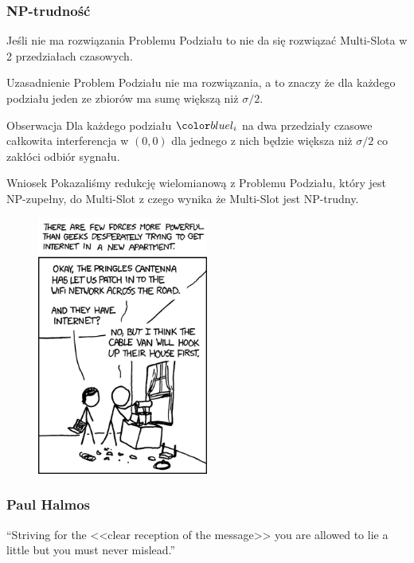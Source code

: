 \documentclass[polish, t,10pt]{beamer}
\begin{document}
\begin{frame}
    \frametitle{NP-trudność}
    Jeśli nie ma rozwiązania Problemu Podziału to nie da się rozwiązać Multi-Slota w 2 przedziałach czasowych.
    \begin{block}{Uzasadnienie}
        Problem Podziału nie ma rozwiązania, a to znaczy że dla każdego podziału jeden ze zbiorów ma sumę większą niż $\sigma/2$.
    \end{block}
    \begin{block}{Obserwacja}
        Dla każdego podziału $\li$ na dwa przedziały czasowe całkowita interferencja w $(0, 0)$ dla jednego z nich będzie większa niż $\sigma/2$ co zakłóci odbiór sygnału.
    \end{block}
    \pause
    \begin{block}{Wniosek}
        Pokazaliśmy redukcję wielomianową z Problemu Podziału, który jest NP-zupełny, do Multi-Slot z czego wynika że Multi-Slot jest NP-trudny.
    \end{block}
\end{frame}

\begin{frame}[c]
    \begin{figure}
        \includegraphics[width=0.5\textwidth]{pictures/obligatory-xkcd.png}
    \end{figure}
\end{frame}

\begin{frame}
    \frametitle{Paul Halmos}
    \vfill
    ``Striving for the <<clear reception of the message>> you are allowed to lie a little
      but you must never mislead.''
\end{frame}
\end{document}

